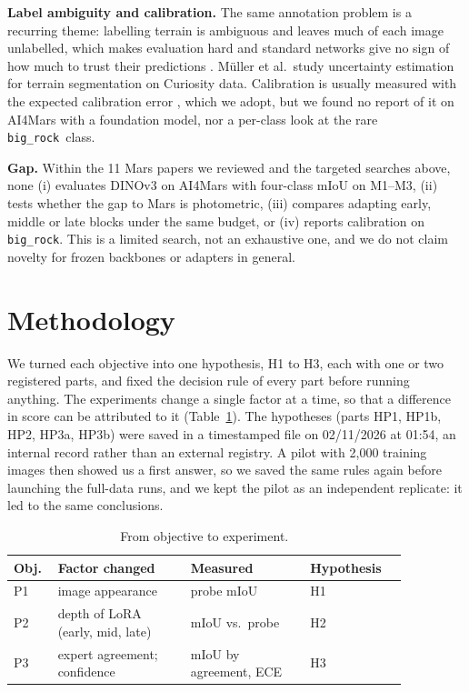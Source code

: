 \documentclass[conference]{IEEEtran}
\newcommand{\bigrock}{\texttt{big\_rock}}
\begin{document}
\textbf{Label ambiguity and calibration.} The same annotation problem is a recurring theme: labelling terrain is ambiguous and leaves much of each image unlabelled, which makes evaluation hard and standard networks give no sign of how much to trust their predictions \cite{muller2023uncertainty}. Müller et al.\ study uncertainty estimation for terrain segmentation on Curiosity data. Calibration is usually measured with the expected calibration error \cite{guo2017calibration}, which we adopt, but we found no report of it on AI4Mars with a foundation model, nor a per-class look at the rare \bigrock\ class.

\textbf{Gap.} Within the 11 Mars papers we reviewed and the targeted searches above, none (i) evaluates DINOv3 on AI4Mars with four-class mIoU on M1--M3, (ii) tests whether the gap to Mars is photometric, (iii) compares adapting early, middle or late blocks under the same budget, or (iv) reports calibration on \bigrock. This is a limited search, not an exhaustive one, and we do not claim novelty for frozen backbones or adapters in general.

\section{Methodology}\label{sec:method}
We turned each objective into one hypothesis, H1 to H3, each with one or two registered parts, and fixed the decision rule of every part before running anything. The experiments change a single factor at a time, so that a difference in score can be attributed to it (Table~\ref{tab:design}). The hypotheses (parts HP1, HP1b, HP2, HP3a, HP3b) were saved in a timestamped file on 02/11/2026 at 01:54, an internal record rather than an external registry. A pilot with 2{,}000 training images then showed us a first answer, so we saved the same rules again before launching the full-data runs, and we kept the pilot as an independent replicate: it led to the same conclusions.
\begin{table}[t]\centering\footnotesize
\caption{From objective to experiment.}\label{tab:design}
\begin{tabular}{@{}p{0.07\linewidth}p{0.30\linewidth}p{0.27\linewidth}p{0.22\linewidth}@{}}\toprule
Obj. & Factor changed & Measured & Hypothesis\\\midrule
P1 & image appearance & probe mIoU & H1\\
P2 & depth of LoRA (early, mid, late) & mIoU vs.\ probe & H2\\
P3 & expert agreement; confidence & mIoU by agreement, ECE & H3\\\bottomrule
\end{tabular}\end{table}
\end{document}
